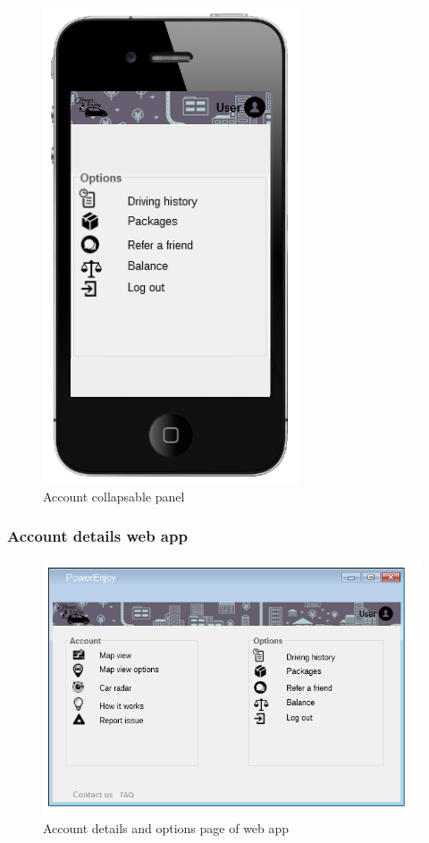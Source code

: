 \clearpage
\begin{figure}[H]
\centering
\includegraphics[]{../images/mookup/Account_mobile_dx}
\caption{Account collapsable panel}
\end{figure}

\clearpage
\subsubsection{Account details web app}
\begin{figure}[H]
\centering
\includegraphics[]{../images/mookup/Account_web}
\caption{Account details and options page of web app}
\end{figure}




